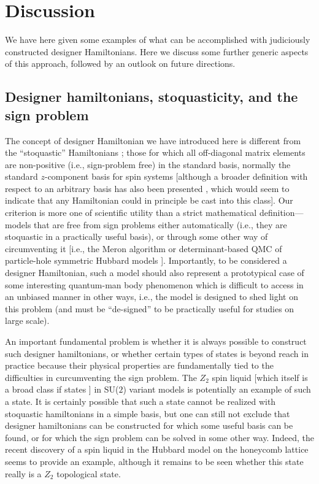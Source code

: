 \documentclass[range]{ar2e}
\begin{document}
\section{Discussion}
\label{sec:discussion}

We have here given some examples of what can be accomplished with judiciously constructed designer Hamiltonians. Here we discuss
some further generic aspects of this approach, followed by an outlook on future directions.

\subsection{Designer hamiltonians, stoquasticity, and the sign problem}

The concept of designer Hamiltonian we have introduced here is different from the ``stoquastic'' Hamiltonians \cite{Terhal08}; 
those for which all off-diagonal matrix elements are non-positive (i.e., sign-problem free) in the standard basis, normally the standard $z$-component 
basis for spin systems [although a broader definition with respect to an arbitrary basis has also been presented \cite{Terhal09}, which would seem to 
indicate that any Hamiltonian could in principle be cast into this class]. Our criterion is more one of scientific utility than a strict mathematical 
definition---models that are free from sign problems either automatically (i.e., they are stoquastic in a practically useful basis), or through some 
other way of circumventing it [i.e., the Meron algorithm \cite{Chandrasekharan99} or determinant-based QMC of particle-hole symmetric Hubbard 
models \cite{White89,Assaad05,Assaad07}]. Importantly, to be considered a designer Hamiltonian, such a model should also represent a prototypical case of 
some interesting quantum-man body phenomenon which is difficult to access in an unbiased manner in other ways, i.e., the model is designed to shed
light on this problem (and must be ``de-signed'' to be practically useful for studies on large scale).

An important fundamental problem is whether it is always possible to construct such designer hamiltonians, or whether certain types of 
states is beyond reach in practice because their physical properties are fundamentally tied to the difficulties in curcumventing the sign problem. 
The $Z_2$ spin liquid [which itself is a broad class if states \cite{Wen03}] in SU($2$) variant models is potentially an example of such a state. 
It is certainly possible that such a state cannot be realized with stoquastic hamiltonians in a simple basis, but one can still not exclude that 
designer hamiltonians can be constructed for which some useful basis can be found, or for which the sign problem can be solved in some other way.
Indeed, the recent discovery of a spin liquid in the Hubbard model on the honeycomb lattice \cite{Meng10} seems to provide an example, although it 
remains to be seen whether this state really is a $Z_2$ topological state.
\end{document}
